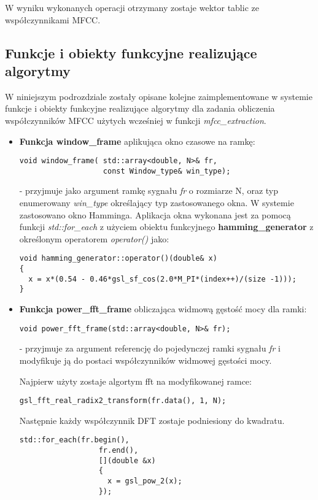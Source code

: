 W wyniku wykonanych operacji otrzymany zostaje wektor tablic ze współczynnikami MFCC.

\subsection{Funkcje i obiekty funkcyjne realizujące algorytmy}

W niniejszym podrozdziale zostały opisane kolejne zaimplementowane w systemie funkcje i obiekty funkcyjne realizujące algorytmy dla zadania obliczenia współczynników MFCC użytych wcześniej w funkcji \textit{mfcc\_extraction}. 
\begin{itemize}
\item{\textbf{Funkcja window\_frame} aplikująca okno czasowe na ramkę:
 \begin{lstlisting}[style=lst:cpp]
void window_frame( std::array<double, N>& fr,
                   const Window_type& win_type);
\end{lstlisting}
}
 - przyjmuje jako argument ramkę sygnału \textit{fr} o rozmiarze N, oraz typ enumerowany \textit{win\_type} określający typ zastosowanego okna. W systemie zastosowano okno Hamminga. Aplikacja okna wykonana jest za pomocą funkcji \textit{std::for\_each} z użyciem obiektu funkcyjnego \textbf{hamming\_generator} z określonym operatorem \textit{operator()} jako:
 \begin{lstlisting}[style=lst:cpp]
void hamming_generator::operator()(double& x) 
{
  x = x*(0.54 - 0.46*gsl_sf_cos(2.0*M_PI*(index++)/(size -1)));
}
\end{lstlisting}

\item{\textbf{Funkcja power\_fft\_frame} obliczająca widmową gęstość mocy dla ramki:
 \begin{lstlisting}[style=lst:cpp]
  void power_fft_frame(std::array<double, N>& fr);
\end{lstlisting}
}
- przyjmuje za argument referencję do pojedynczej ramki sygnału \textit{fr} i modyfikuje ją do postaci współczynników widmowej gęstości mocy. 

Najpierw użyty zostaje algortym fft na modyfikowanej ramce:
\begin{lstlisting}[style=lst:cpp]
    gsl_fft_real_radix2_transform(fr.data(), 1, N);
\end{lstlisting}

Następnie każdy współczynnik DFT zostaje podniesiony do kwadratu.
\begin{lstlisting}[style=lst:cpp]
    std::for_each(fr.begin(),
                  fr.end(),
                  [](double &x)
                  {
                    x = gsl_pow_2(x);
                  });
\end{lstlisting}


\end{itemize}
